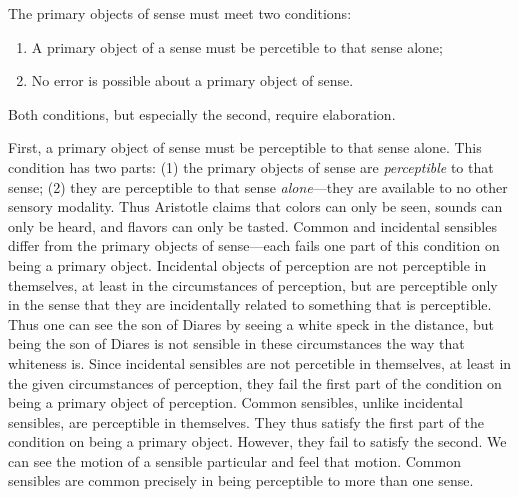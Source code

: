 The primary objects of sense must meet two conditions: 
\begin{enumerate}[(1)]
	\item A primary object of a sense must be percetible to that sense alone;
	\item No error is possible about a primary object of sense.
\end{enumerate}
Both conditions, but especially the second, require elaboration.

First, a primary object of sense must be perceptible to that sense alone. This condition has two parts: (1) the primary objects of sense are \emph{perceptible} to that sense; (2) they are perceptible to that sense \emph{alone}---they are available to no other sensory modality. Thus Aristotle claims that colors can only be seen, sounds can only be heard, and flavors can only be tasted. Common and incidental sensibles differ from the primary objects of sense---each fails one part of this condition on being a primary object. Incidental objects of perception are not perceptible in themselves, at least in the circumstances of perception, but are perceptible only in the sense that they are incidentally related to something that is perceptible. Thus one can see the son of Diares by seeing a white speck in the distance, but being the son of Diares is not sensible in these circumstances the way that whiteness is. Since incidental sensibles are not percetible in themselves, at least in the given circumstances of perception, they fail the first part of the condition on being a primary object of perception. Common sensibles, unlike incidental sensibles, are perceptible in themselves. They thus satisfy the first part of the condition on being a primary object. However, they fail to satisfy the second. We can see the motion of a sensible particular and feel that motion. Common sensibles are common precisely in being perceptible to more than one sense.

